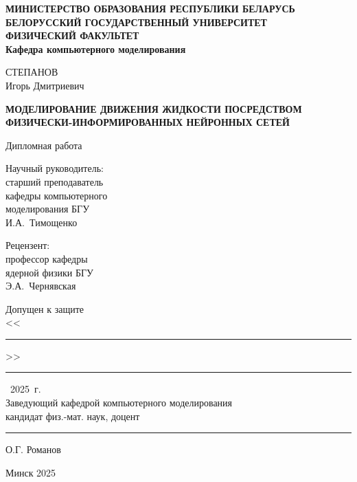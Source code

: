 \thispagestyle{empty}
\begin{center}
\textbf{МИНИСТЕРСТВО ОБРАЗОВАНИЯ РЕСПУБЛИКИ БЕЛАРУСЬ\vspace{7pt}\\
  БЕЛОРУССКИЙ ГОСУДАРСТВЕННЫЙ УНИВЕРСИТЕТ\vspace{7pt}\\
  ФИЗИЧЕСКИЙ ФАКУЛЬТЕТ\vspace{7pt}\\
  Кафедра компьютерного моделирования}
  \vspace{0.5cm}
  
  СТЕПАНОВ\\
  Игорь Дмитриевич
  \vspace{0.5cm}
  
  \textbf{МОДЕЛИРОВАНИЕ ДВИЖЕНИЯ ЖИДКОСТИ ПОСРЕДСТВОМ ФИЗИЧЕСКИ-ИНФОРМИРОВАННЫХ НЕЙРОННЫХ СЕТЕЙ}
  \vspace{0.5cm}

  Дипломная работа
\end{center}
\vspace{0.5cm}
\begin{flushright}
    Научный руководитель:\\
    старший преподаватель\\
    кафедры компьютерного\\ моделирования БГУ\\
    И.А.~Тимощенко
\end{flushright}
\vspace{4pt}

\begin{flushright}
    Рецензент:\\
    профессор кафедры\\
    ядерной физики БГУ\\
    Э.А.~Чернявская 
\end{flushright}

\vspace{4pt}
\begin{flushleft}
    Допущен к защите\vspace{7pt}\\    
    <<\rule{0.5cm}{0.5pt}>>\rule{3.5cm}{0.5pt}~2025~г.\vspace{7pt}\\
    Заведующий кафедрой компьютерного моделирования\\
    кандидат физ.-мат. наук, доцент \rule{1.5cm}{0.5pt}О.Г. Романов
\end{flushleft}
\vfill
\begin{center}
  Минск 2025
\end{center}